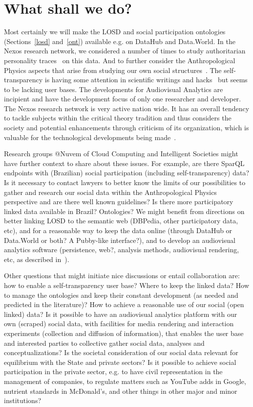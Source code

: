 \documentclass[letterpaper,10pt]{article}
\begin{document}
\section{What shall we do?}
Most certainly we will
make the LOSD and social participation ontologies (Sections~\ref{losd} and~\ref{ont})
available e.g. on DataHub and Data.World.
In the Nexos research network, we
considered a number of times to study authoritarian personality traces~\cite{au}
on this data.
And to further consider the Anthropological Physics aspects that
arise from studying our own social structures~\cite{an,an2}.
The self-transparency is having some attention in scientific writings
and hacks~\cite{aa,aa2} but seems to be lacking user bases.
The developments for Audiovisual Analytics are incipient
and have the development focus of only one researcher and developer.
The Nexos research network is very active nation wide.
It has an overall tendency to tackle subjects within the
critical theory tradition and thus considers the society
and potential enhancements through criticism of its organization,
which is valuable for the technological developments being made~\cite{nexos1}.

Research groups @Nuvem of Cloud Computing and Intelligent Societies might have 
further context to share about these issues.
For example, are there SparQL endpoints with (Brazilian) social participation
(including self-transparency) data?
Is it necessary to contact lawyers to
better know the limits of our possibilities
to gather and research our social data within
the Anthropological Physics perspective
and are there well known guidelines?
Is there more participatory linked data available
in Brazil? Ontologies?
We might benefit from directions 
on better linking LOSD to the semantic web
(DBPedia, other participatory data, etc),
and for a reasonable way to keep the data online
(through DataHub or Data.World or both?
A Pubby-like interface?),
and to develop an audiovisual analytics
software
(persistence, web?, analysis methods, audiovisual rendering, etc,
as described in~\cite{nuvem2}).

Other questions that might initiate
nice discussions or entail collaboration are:
how to enable a self-transparency user base?
Where to keep the linked data?
How to manage the ontologies and keep their
constant development (as needed and predicted in the literature)?
How to achieve a reasonable 
use of our social (open linked) data?
Is it possible to have an audiovisual analytics
platform with our own (scraped) social data,
with facilities for media rendering and
interaction experiments (collection and diffusion of information),
that enables the user base and interested parties to
collective gather social data, analyses and conceptualizations?
Is the societal consideration of our social data
relevant for equilibrium with the State and private sectors?
Is it possible to achieve social participation in the private sector,
e.g. to have civil representation in the management of companies,
to regulate matters such as YouTube adds in Google,
nutrient standards in McDonald's,
and other things in other major and minor institutions?
\end{document}
